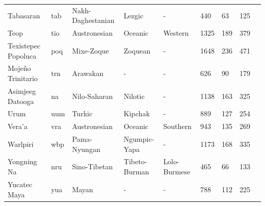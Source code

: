 \begin{longtable}{lllllllll}
Tabasaran & tab & Nakh-Daghestanian & Lezgic & - & 440 & 63 & 125 & \citet{doreco_taba1259} \\
Teop & tio & Austronesian & Oceanic & Western & 1325 & 189 & 379 & \citet{doreco_teop1238} \\
Texistepec Popoluca & poq & Mixe-Zoque & Zoquean & - & 1648 & 236 & 471 & \citet{doreco_texi1237} \\
Mojeño Trinitario & trn & Arawakan & - & - & 626 & 90 & 179 & \citet{doreco_trin1278} \\
Asimjeeg Datooga & na & Nilo-Saharan & Nilotic & - & 1138 & 163 & 325 & \citet{doreco_tsim1256} \\
Urum & uum & Turkic & Kipchak & - & 889 & 127 & 254 & \citet{doreco_urum1249} \\
Vera'a & vra & Austronesian & Oceanic & Southern & 943 & 135 & 269 & \citet{doreco_vera1241} \\
Warlpiri & wbp & Pama-Nyungan & Ngumpic-Yapa & - & 1173 & 168 & 335 & \citet{doreco_warl1254} \\
Yongning Na & nru & Sino-Tibetan & Tibeto-Burman & Lolo-Burmese & 465 & 66 & 133 & \citet{doreco_yong1270} \\
Yucatec Maya & yua & Mayan & - & - & 788 & 112 & 225 & \citet{doreco_yuca1254} \\
\end{longtable}
\endgroup
